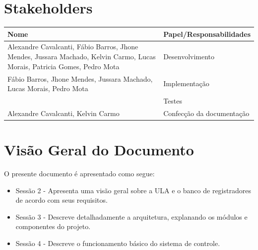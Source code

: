 \documentclass{report}
\begin{document}
  \section{Stakeholders}
    \FloatBarrier
    \begin{table}[H] 
      \begin{center}
        \begin{tabular}[pos]{|m{6cm} | m{8cm}|} 
          \hline 
          \cellcolor[gray]{0.9}\textbf{Nome} & \cellcolor[gray]{0.9}\textbf{Papel/Responsabilidades} \\ \hline
          Alexandre Cavalcanti, Fábio Barros, Jhone Mendes, Jussara Machado, Kelvin Carmo, Lucas Morais, Patricia Gomes, Pedro Mota & Desenvolvimento\\ \hline
          Fábio Barros, Jhone Mendes, Jussara Machado, Lucas Morais, Pedro Mota & Implementação\\ \hline
          & Testes\\ \hline
          Alexandre Cavalcanti, Kelvin Carmo & Confecção da documentação\\ \hline
        \end{tabular}
      \end{center}
    \end{table} 

\section{Visão Geral do Documento}

O presente documento é apresentado como segue:

\begin{itemize}
  
  \item Sessão 2 - Apresenta uma visão geral sobre a ULA e o banco de registradores de acordo com seus requisitos.
  \item Sessão 3 - Descreve detalhadamente a arquitetura, explanando os módulos e componentes do projeto.
  \item Sessão 4 - Descreve o funcionamento básico do sistema de controle.

\end{itemize}

\end{document}
